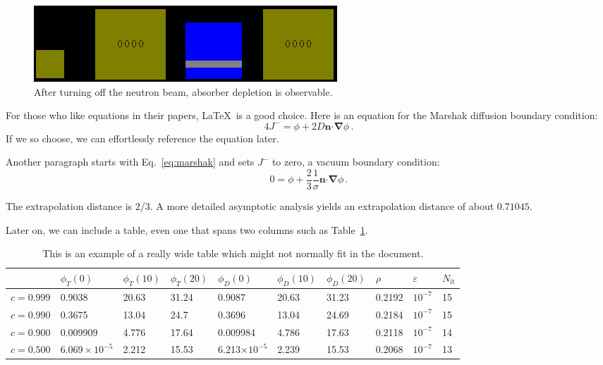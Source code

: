 \documentclass{anstrans}
\renewcommand{\vec}[1]{\bm{#1}} %
\newcommand{\vd}{\bm{\cdot}} %
\newcommand{\grad}{\vec{\nabla}} %
\begin{document}
\begin{figure}
    \centering
    \includegraphics[width=\columnwidth]{atten-off.png}
    \caption{After turning off the neutron beam, absorber depletion is observable.}
    \label{fig:atten-off}
\end{figure}

For those who like equations in their papers, \LaTeX\ is a good choice. Here is
an equation for the Marshak diffusion boundary condition:
\begin{equation} \label{eq:marshak}
  4 J^- = \phi + 2 D \vec{n} \vd \grad \phi \,.
\end{equation}
If we so choose, we can effortlessly reference the equation later.

Another paragraph starts with Eq.~\eqref{eq:marshak} and sets $J^-$ to zero, a
vacuum boundary condition:
\begin{equation*}
  0 = \phi + \frac{2}{3} \frac{1}{\sigma} \vec{n} \vd \grad \phi \,.
\end{equation*}

The extrapolation distance is $2/3$. A more detailed asymptotic analysis yields
an extrapolation distance of about $0.71045$.

Later on, we can include a table, even one that spans two columns such as
Table~\ref{tab:widetable}.
\begin{table}[htb]
  \centering
\begin{tabular}{llllllllll}\toprule
      & $\phi_T(0)$      & $\phi_T(10)$      & $\phi_T(20)$      &
      $\phi_D(0)$      & $\phi_D(10)$      & $\phi_D(20)$      & $\rho$      &
      $\varepsilon$      & $N_\text{it}$
\\ \midrule
$c=0.999$  & 0.9038 & 20.63 & 31.24 & 0.9087 & 20.63 & 31.23 & 0.2192 & $10^{-7}$ & 15
\\
$c=0.990$  & 0.3675 & 13.04 & 24.7 & 0.3696 & 13.04 & 24.69 & 0.2184 & $10^{-7}$ & 15
\\
$c=0.900$  & 0.009909 & 4.776 & 17.64 & 0.009984 & 4.786 & 17.63 & 0.2118 & $10^{-7}$ & 14
\\
$c=0.500$  & $6.069\times 10^{-5}$ & 2.212 & 15.53 & 6.213$\times 10^{-5}$ & 2.239 & 15.53 & 0.2068 & $10^{-7}$ & 13
\\
\bottomrule
\end{tabular}
  \caption{This is an example of a really wide table which might not normally
  fit in the document.}
  \label{tab:widetable}
\end{table}
\end{document}
